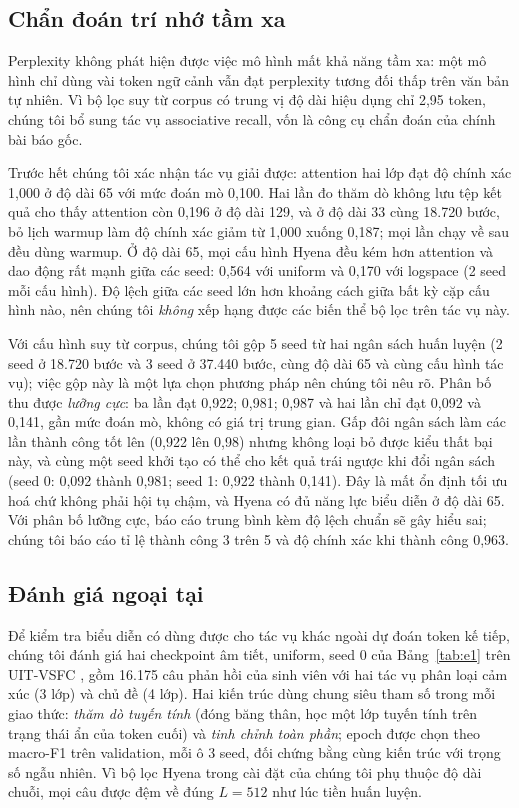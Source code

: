 \documentclass[11pt]{article}
\begin{document}
\subsection{Chẩn đoán trí nhớ tầm xa}

Perplexity không phát hiện được việc mô hình mất khả năng tầm xa: một mô hình
chỉ dùng vài token ngữ cảnh vẫn đạt perplexity tương đối thấp trên văn bản tự nhiên. Vì bộ lọc
suy từ corpus có trung vị độ dài hiệu dụng chỉ 2,95 token, chúng tôi bổ sung tác
vụ associative recall, vốn là công cụ chẩn đoán của chính bài báo gốc.

Trước hết chúng tôi xác nhận tác vụ giải được: attention hai lớp đạt độ chính
xác 1,000 ở độ dài 65 với mức đoán mò 0,100. Hai lần đo thăm dò không lưu tệp
kết quả cho thấy attention còn 0,196 ở độ dài 129, và ở độ dài 33 cùng 18.720
bước, bỏ lịch warmup làm độ chính xác giảm từ 1,000 xuống 0,187; mọi lần chạy về
sau đều dùng warmup. Ở độ dài 65, mọi cấu
hình Hyena đều kém hơn attention và dao động rất mạnh giữa các seed: 0,564 với
\textsf{uniform} và 0,170 với \textsf{logspace} (2 seed mỗi cấu hình). Độ lệch
giữa các seed lớn hơn khoảng cách giữa bất kỳ cặp cấu hình nào, nên chúng tôi
\emph{không} xếp hạng được các biến thể bộ lọc trên tác vụ này.

Với cấu hình suy từ corpus, chúng tôi gộp 5 seed từ hai ngân sách huấn luyện
(2 seed ở 18.720 bước và 3 seed ở 37.440 bước, cùng độ dài 65 và cùng cấu hình
tác vụ); việc gộp này là một lựa chọn phương pháp nên chúng tôi nêu rõ. Phân bố
thu được \emph{lưỡng cực}: ba lần đạt 0,922; 0,981; 0,987 và hai lần chỉ đạt 0,092
và 0,141, gần mức đoán mò, không có giá trị trung gian. Gấp đôi ngân sách làm các lần thành công
tốt lên (0,922 lên 0,98) nhưng không loại bỏ được kiểu thất bại này, và cùng một
seed khởi tạo có thể cho kết quả trái ngược khi đổi ngân sách (seed 0: 0,092 thành 0,981; seed 1:
0,922 thành 0,141). Đây là mất ổn định tối ưu hoá chứ không phải hội tụ chậm,
và Hyena có đủ năng lực biểu diễn ở độ dài 65. Với phân bố lưỡng cực, báo cáo trung
bình kèm độ lệch chuẩn sẽ gây hiểu sai; chúng tôi báo cáo tỉ lệ thành công 3 trên 5 và
độ chính xác khi thành công 0,963.

\subsection{Đánh giá ngoại tại}

Để kiểm tra biểu diễn có dùng được cho tác vụ khác ngoài dự đoán token kế tiếp,
chúng tôi đánh giá hai checkpoint âm tiết, \textsf{uniform},
seed 0 của Bảng~\ref{tab:e1} trên UIT-VSFC \citep{nguyen2018vsfc}, gồm 16.175
câu phản hồi của sinh viên với hai tác vụ phân loại cảm xúc (3 lớp) và chủ đề
(4 lớp). Hai kiến trúc dùng chung siêu tham số trong mỗi giao thức: \emph{thăm dò tuyến tính} (đóng
băng thân, học một lớp tuyến tính trên trạng thái ẩn của token cuối) và
\emph{tinh chỉnh toàn phần}; epoch được chọn theo macro-F1 trên validation, mỗi
ô 3 seed, đối chứng bằng cùng kiến trúc với trọng số ngẫu nhiên. Vì bộ lọc
Hyena trong cài đặt của chúng tôi phụ thuộc độ dài chuỗi, mọi câu được đệm về
đúng $L = 512$ như lúc tiền huấn luyện.
\end{document}
